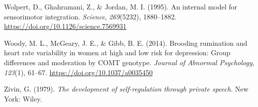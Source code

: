 \documentclass[a4paper,12pt,twoside,openright,oldfontcommands]{memoir}
\begin{document}
\hypertarget{ref-wolpert_internal_1995}{}
Wolpert, D., Ghahramani, Z., \& Jordan, M. I. (1995). An internal model
for sensorimotor integration. \emph{Science}, \emph{269}(5232),
1880--1882. \url{https://doi.org/10.1126/science.7569931}

\hypertarget{ref-woody_brooding_2014}{}
Woody, M. L., McGeary, J. E., \& Gibb, B. E. (2014). Brooding rumination
and heart rate variability in women at high and low risk for depression:
Group differences and moderation by COMT genotype. \emph{Journal of
Abnormal Psychology}, \emph{123}(1), 61--67.
\url{https://doi.org/10.1037/a0035450}

\hypertarget{ref-zivin_development_1979}{}
Zivin, G. (1979). \emph{The development of self-regulation through
private speech}. New York: Wiley.
\end{document}
